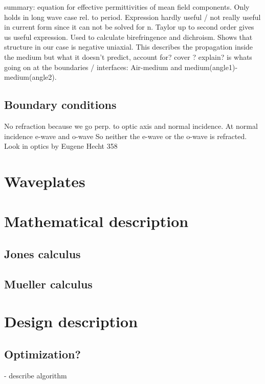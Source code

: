 summary:
equation for effective permittivities of mean field components. Only holds in long wave case rel. to period. Expression hardly useful / not really useful in current form since it can not be solved for n. Taylor up to second order gives us useful expression.
Used to calculate birefringence and dichroism.
Shows that structure in our case is negative uniaxial.
This describes the propagation inside the medium but what it doesn't predict, account for? cover ? explain? is whats going on at the boundaries / interfaces: Air-medium and medium(angle1)-medium(angle2). 

\subsection{Boundary conditions}
No refraction because we go perp. to optic axis and normal incidence. At normal incidence e-wave and o-wave So neither the e-wave or the o-wave is refracted. Look in optics by Eugene Hecht 358

\section{Waveplates}
\label{sec:waveplates}

\section{Mathematical description}
\label{sec:mathdescription}

\subsection{Jones calculus}

\subsection{Mueller calculus}
\label{sec:muellercalc}

\section{Design description}
\label{sec:design}

\subsection{Optimization?}
- describe algorithm
